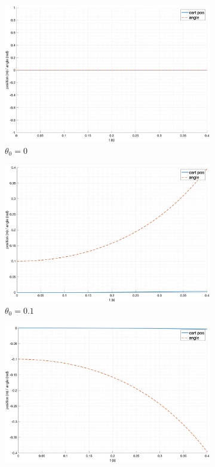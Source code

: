 \begin{figure}[ht!]
    \centering
    \begin{subfigure}[b]{0.45\textwidth}
        \includegraphics[width=\textwidth]{media/plots/free_motion/lin_1.png}
        \caption{$\theta_0 = 0$}
  \end{subfigure}
    \begin{subfigure}[b]{0.45\textwidth}
        \includegraphics[width=\textwidth]{media/plots/free_motion/lin_2.png}
        \caption{$\theta_0 = 0.1$}
    \end{subfigure}
    \begin{subfigure}[b]{0.45\textwidth}
        \includegraphics[width=\textwidth]{media/plots/free_motion/lin_3.png}

\end{subfigure}
\end{figure}
